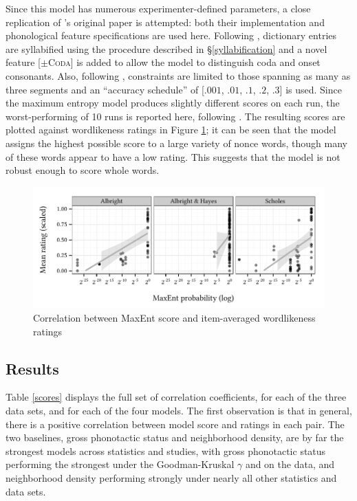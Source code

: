 Since this model has numerous experimenter-defined parameters, a close replication of \citeauthor{Hayes2008a}'s original paper is attempted: both their implementation and phonological feature specifications are used here.
Following \citet{HayesInPress}, dictionary entries are syllabified using the procedure described in \S\ref{syllabification} and a novel feature [$\pm$\textsc{Coda}] is added to allow the model to distinguish coda and onset consonants.
Also, following \citeauthor{Hayes2008a}, constraints are limited to those spanning as many as three segments and an ``accuracy schedule'' of [$.001$, $.01$, $.1$, $.2$, $.3$] is used.
Since the maximum entropy model produces slightly different scores on each run, the worst-performing of 10 runs is reported here, following \citeauthor{Hayes2008a}.
The resulting scores are plotted against wordlikeness ratings in Figure \ref{maxent}; it can be seen that the model assigns the highest possible score to a large variety of nonce words, though many of these words appear to have a low rating. This suggests that the model is not robust enough to score whole words.

\begin{figure}[ht]
\centering
\includegraphics{maxent.pdf}
\caption{Correlation between MaxEnt score and item-averaged wordlikeness ratings}
\label{maxent}
\end{figure}

\subsection{Results}

Table \ref{scores} displays the full set of correlation coefficients, for each of the three data sets, and for each of the four models. The first observation is that in general, there is a positive correlation between model score and ratings in each pair. The two baselines, gross phonotactic status and neighborhood density, are by far the strongest models across statistics and studies, with gross phonotactic status performing the strongest under the Goodman-Kruskal $\gamma$ and on the \citet{Albright2007} data, and neighborhood density performing strongly under nearly all other statistics and data sets. 

